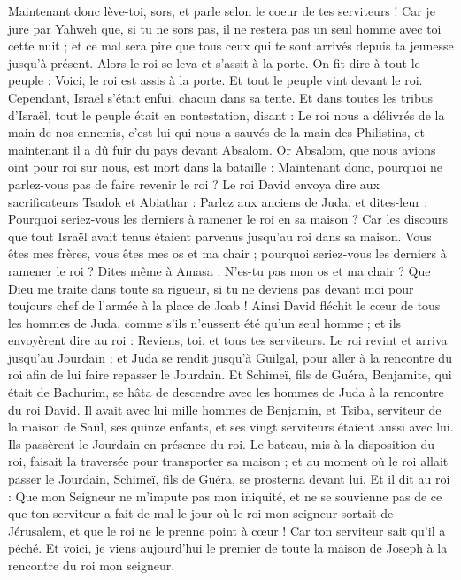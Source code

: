 \begin{multicols}{2}
Maintenant donc lève-toi, sors, et parle selon le coeur de tes serviteurs ! Car je jure par Yahweh que, si tu ne sors pas, il ne restera pas un seul homme avec toi cette nuit ; et ce mal sera pire que tous ceux qui te sont arrivés depuis ta jeunesse jusqu'à présent.
Alors le roi se leva et s'assit à la porte. On fit dire à tout le peuple : Voici, le roi est assis à la porte. Et tout le peuple vint devant le roi. Cependant, Israël s’était enfui, chacun dans sa tente.
Et dans toutes les tribus d'Israël, tout le peuple était en contestation, disant : Le roi nous a délivrés de la main de nos ennemis, c'est lui qui nous a sauvés de la main des Philistins, et maintenant il a dû fuir du pays devant Absalom.
Or Absalom, que nous avions oint pour roi sur nous, est mort dans la bataille : Maintenant donc, pourquoi ne parlez-vous pas de faire revenir le roi ?
Le roi David envoya dire aux sacrificateurs Tsadok et Abiathar : Parlez aux anciens de Juda, et dites-leur : Pourquoi seriez-vous les derniers à ramener le roi en sa maison ? Car les discours que tout Israël avait tenus étaient parvenus jusqu'au roi dans sa maison.
Vous êtes mes frères, vous êtes mes os et ma chair ; pourquoi seriez-vous les derniers à ramener le roi ?
Dites même à Amasa : N'es-tu pas mon os et ma chair ? Que Dieu me traite dans toute sa rigueur, si tu ne deviens pas devant moi pour toujours chef de l'armée à la place de Joab !
Ainsi David fléchit le cœur de tous les hommes de Juda, comme s'ils n'eussent été qu'un seul homme ; et ils envoyèrent dire au roi : Reviens, toi, et tous tes serviteurs.
Le roi revint et arriva jusqu'au Jourdain ; et Juda se rendit jusqu'à Guilgal, pour aller à la rencontre du roi afin de lui faire repasser le Jourdain.
Et Schimeï, fils de Guéra, Benjamite, qui était de Bachurim, se hâta de descendre avec les hommes de Juda à la rencontre du roi David.
Il avait avec lui mille hommes de Benjamin, et Tsiba, serviteur de la maison de Saül, ses quinze enfants, et ses vingt serviteurs étaient aussi avec lui. Ils passèrent le Jourdain en présence du roi.
Le bateau, mis à la disposition du roi, faisait la traversée pour transporter sa maison ; et au moment où le roi allait passer le Jourdain, Schimeï, fils de Guéra, se prosterna devant lui.
Et il dit au roi : Que mon Seigneur ne m'impute pas mon iniquité, et ne se souvienne pas de ce que ton serviteur a fait de mal le jour où le roi mon seigneur sortait de Jérusalem, et que le roi ne le prenne point à cœur !
Car ton serviteur sait qu'il a péché. Et voici, je viens aujourd'hui le premier de toute la maison de Joseph à la rencontre du roi mon seigneur.

\end{multicols}
